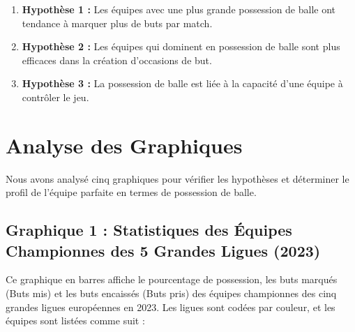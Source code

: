 \documentclass[
]{article}
\providecommand{\tightlist}{%
  \setlength{\itemsep}{0pt}\setlength{\parskip}{0pt}}
\begin{document}
\begin{enumerate}
\def\labelenumi{\arabic{enumi}.}
\tightlist
\item
  \textbf{Hypothèse 1 :} Les équipes avec une plus grande possession de
  balle ont tendance à marquer plus de buts par match.
\item
  \textbf{Hypothèse 2 :} Les équipes qui dominent en possession de balle
  sont plus efficaces dans la création d'occasions de but.
\item
  \textbf{Hypothèse 3 :} La possession de balle est liée à la capacité
  d'une équipe à contrôler le jeu.
\end{enumerate}

\section{Analyse des Graphiques}\label{analyse-des-graphiques-2}

Nous avons analysé cinq graphiques pour vérifier les hypothèses et
déterminer le profil de l'équipe parfaite en termes de possession de
balle.

\subsection{Graphique 1 : Statistiques des Équipes Championnes des 5
Grandes Ligues
(2023)}\label{graphique-1-statistiques-des-uxe9quipes-championnes-des-5-grandes-ligues-2023}

Ce graphique en barres affiche le pourcentage de possession, les buts
marqués (Buts mis) et les buts encaissés (Buts pris) des équipes
championnes des cinq grandes ligues européennes en 2023. Les ligues sont
codées par couleur, et les équipes sont listées comme suit :
\end{document}
